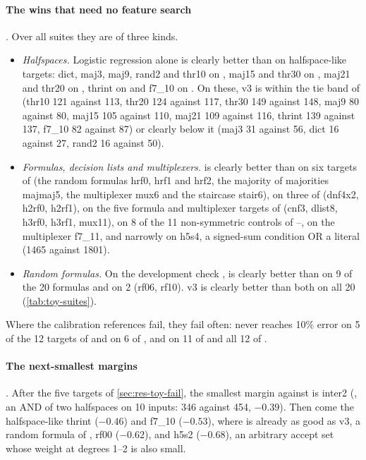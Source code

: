 \paragraph{The wins that need no feature search} . Over all suites they are of three kinds.
\begin{itemize}
\item \emph{Halfspaces.} Logistic regression alone is clearly better than  on halfspace-like targets: dict, maj3, maj9, rand2 and thr10 on , maj15 and thr30 on , maj21 and thr20 on , thrint on  and f7\_10 on . On these, v3 is within the tie band of  (thr10 121 against 113, thr20 124 against 117, thr30 149 against 148, maj9 80 against 80, maj15 105 against 110, maj21 109 against 116, thrint 139 against 137, f7\_10 82 against 87) or clearly below it (maj3 31 against 56, dict 16 against 27, rand2 16 against 50).
\item \emph{Formulas, decision lists and multiplexers.}  is clearly better than  on six targets of  (the random formulas hrf0, hrf1 and hrf2, the majority of majorities majmaj5, the multiplexer mux6 and the staircase stair6), on three of  (dnf4x2, h2rf0, h2rf1), on the five formula and multiplexer targets of  (cnf3, dlist8, h3rf0, h3rf1, mux11), on 8 of the 11 non-symmetric controls of --, on the multiplexer f7\_11, and narrowly on h5s4, a signed-sum condition OR a literal (1465 against 1801).
\item \emph{Random formulas.} On the development check ,  is clearly better than  on 9 of the 20 formulas and  on 2 (rf06, rf10). v3 is clearly better than both on all 20 (\cref{tab:toy-suites}).
\end{itemize}
Where the calibration references fail, they fail often:  never reaches 10\% error on 5 of the 12 targets of  and on 6 of , and  on 11 of  and all 12 of .

\paragraph{The next-smallest margins} . After the five targets of \cref{sec:res-toy-fail}, the smallest margin against  is inter2 (, an AND of two halfspaces on 10 inputs: 346 against 454, $-0.39$). Then come the halfspace-like thrint ($-0.46$) and f7\_10 ($-0.53$), where  is already as good as v3, a random formula of , rf00 ($-0.62$), and h5s2 ($-0.68$), an arbitrary accept set whose weight at degrees 1--2 is also small.

